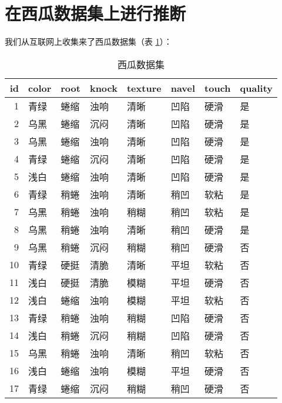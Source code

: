 \documentclass{ctexart}
\begin{document}
    \section{在西瓜数据集上进行推断}
    我们从互联网上收集来了西瓜数据集（表 \ref{tab:watermelon-1}）：
    \begin{table}[H]
        \begin{center}
            \caption{西瓜数据集}
            \label{tab:watermelon-1}
            \begin{tabular}{rlllllll}
                \toprule
              id & color & root & knock & texture & navel & touch & quality \\
                \midrule
                1 & 青绿 & 蜷缩 & 浊响 & 清晰 & 凹陷 & 硬滑 & 是 \\
                2 & 乌黑 & 蜷缩 & 沉闷 & 清晰 & 凹陷 & 硬滑 & 是 \\
                3 & 乌黑 & 蜷缩 & 浊响 & 清晰 & 凹陷 & 硬滑 & 是 \\
                4 & 青绿 & 蜷缩 & 沉闷 & 清晰 & 凹陷 & 硬滑 & 是 \\
                5 & 浅白 & 蜷缩 & 浊响 & 清晰 & 凹陷 & 硬滑 & 是 \\
                6 & 青绿 & 稍蜷 & 浊响 & 清晰 & 稍凹 & 软粘 & 是 \\
                7 & 乌黑 & 稍蜷 & 浊响 & 稍糊 & 稍凹 & 软粘 & 是 \\
                8 & 乌黑 & 稍蜷 & 浊响 & 清晰 & 稍凹 & 硬滑 & 是 \\
                9 & 乌黑 & 稍蜷 & 沉闷 & 稍糊 & 稍凹 & 硬滑 & 否 \\
            10 & 青绿 & 硬挺 & 清脆 & 清晰 & 平坦 & 软粘 & 否 \\
            11 & 浅白 & 硬挺 & 清脆 & 模糊 & 平坦 & 硬滑 & 否 \\
            12 & 浅白 & 蜷缩 & 浊响 & 模糊 & 平坦 & 软粘 & 否 \\
            13 & 青绿 & 稍蜷 & 浊响 & 稍糊 & 凹陷 & 硬滑 & 否 \\
            14 & 浅白 & 稍蜷 & 沉闷 & 稍糊 & 凹陷 & 硬滑 & 否 \\
            15 & 乌黑 & 稍蜷 & 浊响 & 清晰 & 稍凹 & 软粘 & 否 \\
            16 & 浅白 & 蜷缩 & 浊响 & 模糊 & 平坦 & 硬滑 & 否 \\
            17 & 青绿 & 蜷缩 & 沉闷 & 稍糊 & 稍凹 & 硬滑 & 否 \\
                \bottomrule
              \end{tabular}
        \end{center}
    \end{table}
\end{document}
